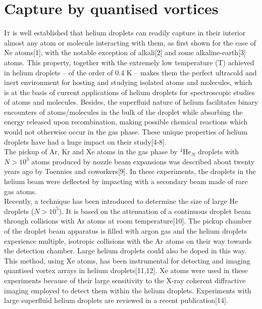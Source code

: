 	\section{Capture by quantised vortices}
		\lettrine[lines=3,findent=3pt,nindent=0pt]{I}{t} is well established that helium droplets can readily capture in their interior almost any atom or molecule interacting with them, as first shown for the case of Ne atoms[1], with the notable exception of alkali[2] and some alkaline-earth[3] atoms. This property, together with the extremely low temperature (T) achieved in helium droplets -- of the order of 0.4 K -- makes them the perfect ultracold and inert environment for hosting and studying isolated atoms and molecules, which is at the basis of current applications of helium droplets for spectroscopic studies of atoms and molecules. Besides, the superfluid nature of helium facilitates binary encounters of atoms/molecules in the bulk of the droplet while absorbing the energy released upon recombination, making possible chemical reactions which would not otherwise occur in the gas phase. These unique properties of helium droplets have had a huge impact on their study[4-8].\\

		The pickup of Ar, Kr and Xe atoms in the gas phase by $^4$He$_N$ droplets with $N>10^3$ atoms produced by nozzle beam expansions was described about twenty years ago by Toennies and coworkers[9]. In these experiments, the droplets in the helium beam were deflected by impacting with a secondary beam made of rare gas atoms.\\

		Recently, a technique has been introduced to determine the size of large He droplets ($N>10^5$). It is based on the attenuation of a continuous droplet beam through collisions with Ar atoms at room temperature[10]. The pickup chamber of the droplet beam apparatus is filled with argon gas and the helium droplets experience multiple, isotropic collisions with the Ar atoms on their way towards the detection chamber. Large helium droplets could also be doped in this way. This method, using Xe atoms, has been instrumental for detecting and imaging quantised vortex arrays in helium droplets[11,12]. Xe atoms were used in these experiments because of their large sensitivity to the X-ray coherent diffractive imaging employed to detect them within the helium droplets. Experiments with large superfluid helium droplets are reviewed in a recent publication[14].\\

